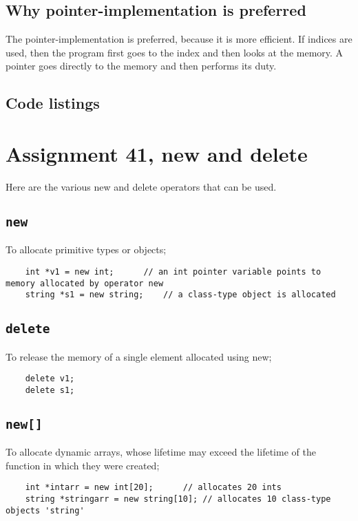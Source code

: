 \documentclass[11pt]{article}
\begin{document}
\subsection{Why pointer-implementation is preferred}
The pointer-implementation is preferred, because it is more efficient.
If indices are used, then the program first goes to the index and then
looks at the memory. A pointer goes directly to the memory and then performs
its duty.

\subsection*{Code listings}


\section*{Assignment 41, new and delete}
Here are the various new and delete operators that can be used.

\subsection{\texttt{new}}
To allocate primitive types or objects;
\begin{lstlisting}
	int *v1 = new int;		// an int pointer variable points to memory allocated by operator new
	string *s1 = new string;	// a class-type object is allocated
\end{lstlisting}

\subsection{\texttt{delete}}
To release the memory of a single element allocated using new;
\begin{lstlisting}
	delete v1;
	delete s1;
\end{lstlisting}

\subsection{\texttt{new[]}}
To allocate dynamic arrays, whose lifetime may exceed the lifetime of the function in which they were created;

\begin{lstlisting}
	int *intarr = new int[20];		// allocates 20 ints
	string *stringarr = new string[10];	// allocates 10 class-type objects 'string'
\end{lstlisting}
\end{document}
